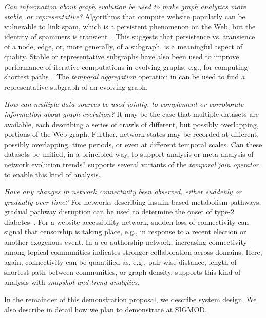 {\em Can information about graph evolution be used to make graph
  analytics more stable, or representative?}  Algorithms that compute
website popularly can be vulnerable to link spam, which is a
persistent phenomenon on the Web, but the identity of spammers is
transient~\cite{DBLP:conf/cikm/YangQZGL07}.  This suggests that
persistence vs. transience of a node, edge, or, more generally, of a
subgraph, is a meaningful aspect of quality.  Stable or representative
subgraphs have also been used to improve performance of iterative
computations in evolving graphs, e.g., for computing shortest
paths~\cite{Ren2011}.  The {\em temporal aggregation} operation in \ql
can be used to find a representative subgraph of an evolving graph.

{\em How can multiple data sources be used jointly, to complement or
  corroborate information about graph evolution?}  It may be the case
that multiple datasets are available, each describing a series of
crawls of different, but possibly overlapping, portions of the Web
graph.  Further, network states may be recorded at different, possibly
overlapping, time periods, or even at different temporal scales.  Can
these datasets be unified, in a principled way, to support analysis or
meta-analysis of network evolution trends?  \ql supports several
variants of the {\em temporal join operator} to enable this kind of
analysis.

{\em Have any changes in network connectivity been observed, either
  suddenly or gradually over time?}  For networks describing
insulin-based metabolism pathways, gradual pathway disruption can be
used to determine the onset of type-2
diabetes~\cite{DBLP:journals/tcsb/BeyerTLSF10}.  For a website
accessibility network, sudden loss of connectivity can signal that
censorship is taking place, e.g., in response to a recent election or
another exogenous event.  In a co-authorship network, increasing
connectivity among topical communities indicates stronger
collaboration across domains.  Here, again, connectivity can be
quantified as, e.g., pair-wise distance, length of shortest path
between communities, or graph density.  \ql supports this kind of
analysis with {\em snapshot and trend analytics}.

In the remainder of this demonstration proposal, we describe \ql
system design.  We also describe in detail how we plan to demonstrate
\ql at SIGMOD.
